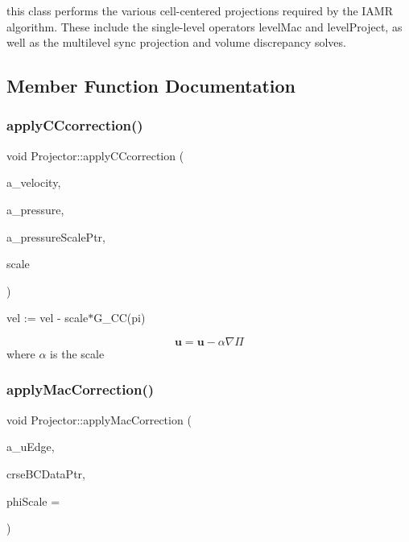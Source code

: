 this class performs the various cell-\/centered projections required by the I\+A\+MR algorithm. These include the single-\/level operators level\+Mac and level\+Project, as well as the multilevel sync projection and volume discrepancy solves. 

\subsection{Member Function Documentation}
\mbox{\label{class_projector_a760ab8ccacded1496730c00c952ee957}} 
\subsubsection{\texorpdfstring{apply\+C\+Ccorrection()}{applyCCcorrection()}}
{\footnotesize\ttfamily void Projector\+::apply\+C\+Ccorrection (\begin{DoxyParamCaption}\item[{\textbf{ Level\+Data}$<$ \textbf{ F\+Array\+Box} $>$ \&}]{a\+\_\+velocity,  }\item[{\textbf{ Level\+Data}$<$ \textbf{ F\+Array\+Box} $>$ $\ast$}]{a\+\_\+pressure,  }\item[{\textbf{ Level\+Data}$<$ \textbf{ F\+Array\+Box} $>$ $\ast$}]{a\+\_\+pressure\+Scale\+Ptr,  }\item[{const \textbf{ Real}}]{scale }\end{DoxyParamCaption})\hspace{0.3cm}{\ttfamily [protected]}}



vel \+:= vel -\/ scale$\ast$\+G\+\_\+\+CC(pi) 

\[ \mathbf{u} = \mathbf{u} - \alpha \nabla \Pi \] where $ \alpha $ is the scale \mbox{\label{class_projector_ad55a4e31a840ff9476db4a2b7b9833cb}} 
\subsubsection{\texorpdfstring{apply\+Mac\+Correction()}{applyMacCorrection()}}
{\footnotesize\ttfamily void Projector\+::apply\+Mac\+Correction (\begin{DoxyParamCaption}\item[{\textbf{ Level\+Data}$<$ \textbf{ Flux\+Box} $>$ \&}]{a\+\_\+u\+Edge,  }\item[{\textbf{ Level\+Data}$<$ \textbf{ F\+Array\+Box} $>$ $\ast$}]{crse\+B\+C\+Data\+Ptr,  }\item[{\textbf{ Real}}]{phi\+Scale = {} }\end{DoxyParamCaption})}



